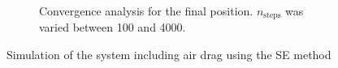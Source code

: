 \begin{figure}[h]
\begin{subfigure}{0.45\linewidth}
\begin{subfigure}{\linewidth}
        \end{subfigure}
        \caption{Convergence analysis for the final position. $n_\textrm{steps}$ was varied between 100 and 4000.}
        \label{fig:gravfrict:conv}
    \end{subfigure}
    \caption{Simulation of the system including air drag using the SE method}
\end{figure}
